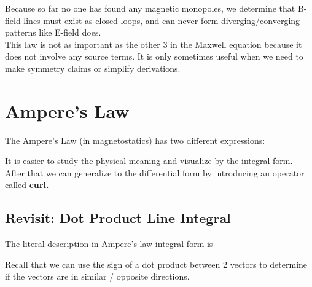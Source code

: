 \documentclass[class=article, crop=false, 12pt]{standalone}
\begin{document}
Because so far no one has found any magnetic monopoles,
we determine that B-field lines must exist as closed loops,
and can never form diverging/converging patterns like E-field does.\\

This law is not as important as the other 3 in the Maxwell equation because 
it does not involve any source terms.
It is only sometimes useful when we need to make symmetry claims or simplify derivations.



\linesep
\section{Ampere's Law}

The Ampere's Law (in magnetostatics) has two different expressions:

It is easier to study the physical meaning and visualize by the integral form.
After that we can generalize to the differential form by introducing an operator called \bf{curl}.

\subsection{Revisit: Dot Product Line Integral}

The literal description in Ampere's law integral form is

Recall that we can use the sign of a dot product between 2 vectors to 
determine if the vectors are in similar / opposite directions. 
\end{document}
